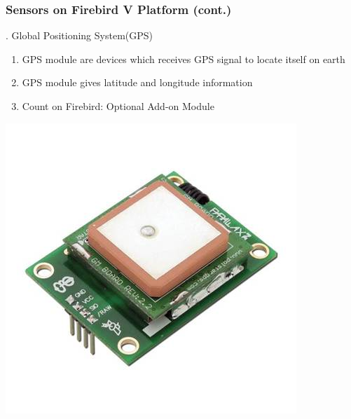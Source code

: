 \documentclass[10pt,red]{beamer}
\begin{document}
\begin{frame}
	\frametitle{Sensors on Firebird V Platform (cont.)} . Global Positioning System(GPS)	
		\vfill
		\begin{minipage}[c]{0.5\textwidth}
			\begin{enumerate}
				\item <+-|alert@+> GPS module are devices which receives GPS signal to locate itself on earth  \\[10pt]
				\item <+-|alert@+> GPS module gives latitude and longitude information  \\[10pt]
				\item <+-|alert@+> Count on Firebird: Optional Add-on Module
			\end{enumerate}
		\end{minipage}
		\hfill
		\begin{minipage}[c]{0.4\textwidth}
			\includegraphics[width=\linewidth]{GPS}
		\end{minipage}	
\end{frame}


\end{document}
